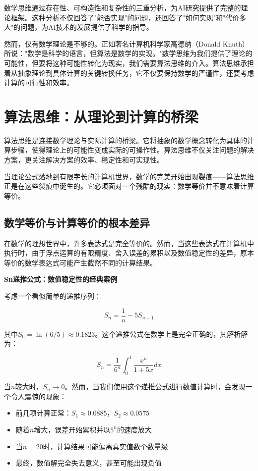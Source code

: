 数学思维通过存在性、可构造性和复杂性的三重分析，为AI研究提供了完整的理论框架。这种分析不仅回答了"能否实现"的问题，还回答了"如何实现"和"代价多大"的问题，为AI技术的发展提供了科学的指导。

然而，仅有数学理论是不够的。正如著名计算机科学家高德纳（Donald Knuth）所说："数学是科学的语言，但算法是数学的实现。"数学思维为我们提供了理论的可能性，但要将这种可能性转化为现实，我们需要算法思维的介入。算法思维承担着从抽象理论到具体计算的关键转换任务，它不仅要保持数学的严谨性，还要考虑计算的可行性和效率。

\section{算法思维：从理论到计算的桥梁}

算法思维是连接数学理论与实际计算的桥梁。它将抽象的数学概念转化为具体的计算步骤，使得理论上的可能性变成实际的可操作性。算法思维不仅关注问题的解决方案，更关注解决方案的效率、稳定性和可实现性。

当理论公式落地到有限字长的计算机世界，数学的完美开始出现裂痕——算法思维正是在这些裂痕中诞生的。它必须面对一个残酷的现实：数学等价并不意味着计算等价。

\subsection{数学等价与计算等价的根本差异}

在数学的理想世界中，许多表达式是完全等价的。然而，当这些表达式在计算机中执行时，由于浮点运算的有限精度、舍入误差的累积以及数值稳定性的差异，原本等价的数学表达式可能产生截然不同的计算结果。

\textbf{Sn递推公式：数值稳定性的经典案例}

考虑一个看似简单的递推序列：

$$S_n = \frac{1}{n} - 5S_{n-1}$$

其中$S_0 = \ln(6/5) \approx 0.1823$。这个递推公式在数学上是完全正确的，其解析解为：

$$S_n = \frac{1}{6^n} \int_0^1 \frac{x^n}{1+5x} dx$$

当$n$较大时，$S_n \to 0$。然而，当我们使用这个递推公式进行数值计算时，会发现一个令人震惊的现象：

\begin{itemize}
\item 前几项计算正常：$S_1 \approx 0.0885$，$S_2 \approx 0.0575$
\item 随着$n$增大，误差开始累积并以$5^n$的速度放大
\item 当$n=20$时，计算结果可能偏离真实值数个数量级
\item 最终，数值解完全失去意义，甚至可能出现负值
\end{itemize}

